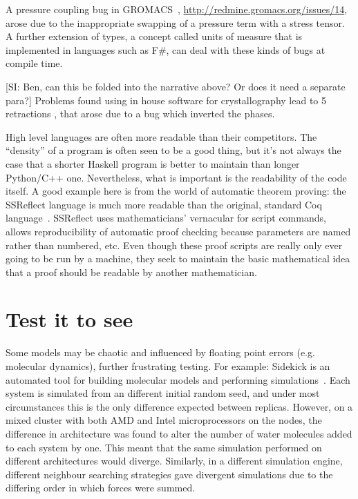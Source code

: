 \documentclass[conference]{IEEEtran}
\begin{document}
A pressure coupling bug in GROMACS~\cite{Hess2008},
\url{http://redmine.gromacs.org/issues/14}, arose due to the
inappropriate swapping of a pressure term with a stress tensor.  A
further extension of types, a concept called units of measure that is
implemented in languages such as F\#, can deal with these kinds of
bugs at compile time.

[SI: Ben, can this be folded into the narrative above? Or does it need a separate para?]
Problems found using in house software for crystallography lead to 5
retractions \cite{Miller2006}, that arose due to a bug which inverted
the phases.

High level languages are often more readable than their
competitors. The ``density'' of a program is often seen to be a good
thing, but it's not always the case that a shorter Haskell program is
better to maintain than longer Python/C++ one. Nevertheless, what is
important is the readability of the code itself. A good example here
is from the world of automatic theorem proving: the SSReflect language
is much more readable than the original, standard Coq
language~\cite{GonthierZND13}. SSReflect uses mathematicians'
vernacular for script commands, allows reproducibility of automatic
proof checking because parameters are named rather than numbered,
etc. Even though these proof scripts are really only ever going to be
run by a machine, they seek to maintain the basic mathematical idea
that a proof should be readable by another mathematician.

\section{Test it to see}

Some models may be chaotic and influenced by floating point errors
(e.g. molecular dynamics), further frustrating testing. For example:
Sidekick is an automated tool for building molecular models and
performing simulations~\cite{Hall2014Sidekick}. Each system is
simulated from an different initial random seed, and under most
circumstances this is the only difference expected between
replicas. However, on a mixed cluster with both AMD and Intel
microprocessors on the nodes, the difference in architecture was found
to alter the number of water molecules added to each system by
one. This meant that the same simulation performed on different
architectures would diverge. Similarly, in a different simulation
engine, different neighbour searching strategies gave divergent
simulations due to the differing order in which forces were summed.
\end{document}
